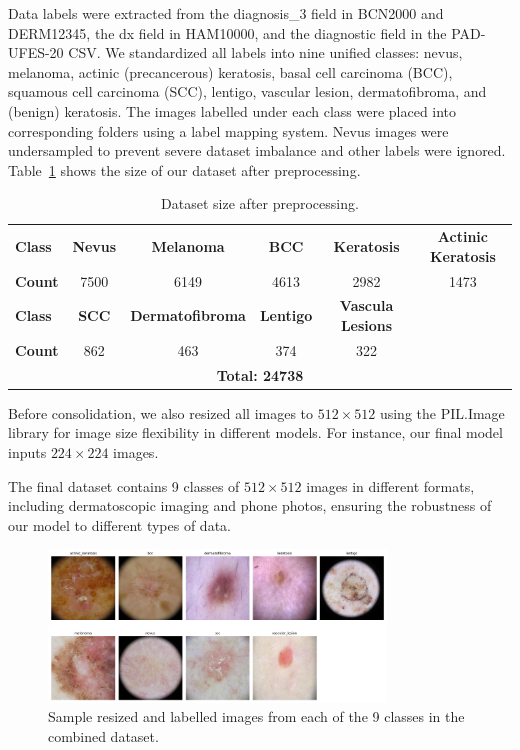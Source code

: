 \documentclass{article} %
\begin{document}
Data labels were extracted from the diagnosis\_3 field in BCN2000 and DERM12345, the dx field in HAM10000, and the diagnostic field in the PAD-UFES-20 CSV. We standardized all labels into nine unified classes: nevus, melanoma, actinic (precancerous) keratosis, basal cell carcinoma (BCC), squamous cell carcinoma (SCC), lentigo, vascular lesion, dermatofibroma, and (benign) keratosis. The images labelled under each class were placed into corresponding folders using a label mapping system. Nevus images were undersampled to prevent severe dataset imbalance and other labels were ignored. Table~\ref{dataset-size} shows the size of our dataset after preprocessing.


\begin{table}[H]
\caption{Dataset size after preprocessing.}
\label{dataset-size}
\begin{center}
\footnotesize
\begin{tabular}{lccccc}
\toprule
\textbf{Class} & \textbf{Nevus} & \textbf{Melanoma} & \textbf{BCC} & \textbf{Keratosis} & \textbf{Actinic Keratosis} \\
\textbf{Count} & 7500 & 6149 & 4613 & 2982 & 1473 \\
\midrule
\textbf{Class} & \textbf{SCC} & \textbf{Dermatofibroma} & \textbf{Lentigo} & \textbf{Vascula Lesions} & \\
\textbf{Count} & 862 & 463 & 374 & 322 & \\
\midrule
\multicolumn{6}{c}{\textbf{Total: 24738}} \\
\bottomrule
\end{tabular}
\end{center}
\end{table}

Before consolidation, we also resized all images to $512 \times 512$ using the PIL.Image library for image size flexibility in different models. For instance, our final model inputs $224 \times 224$ images.

The final dataset contains 9 classes of $512 \times 512$ images in different formats, including dermatoscopic imaging and phone photos, ensuring the robustness of our model to different types of data.


\begin{figure}[H]
\begin{center}
\includegraphics[width=0.8\textwidth]{Figs/sample_images.png}
\end{center}
\caption{Sample resized and labelled images from each of the 9 classes in the combined dataset.}
\label{fig:sample_images}
\end{figure}
\end{document}
